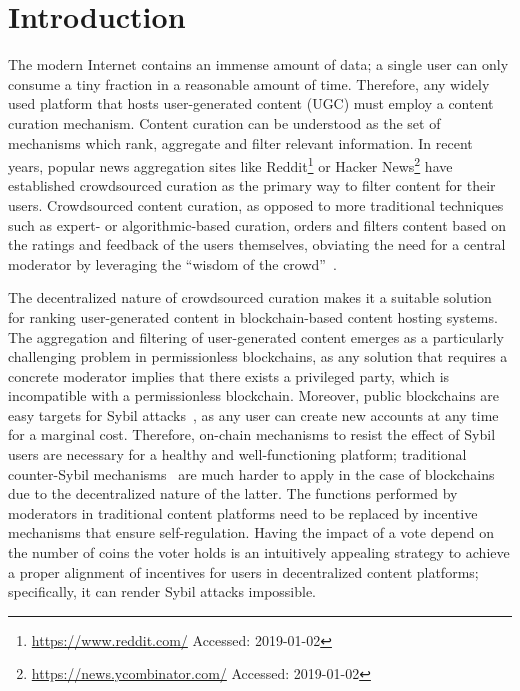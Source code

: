 \section{Introduction}
  The modern Internet contains an immense amount of data; a single user can only
  consume a tiny fraction in a reasonable amount of time. Therefore, any widely
  used platform that hosts user-generated content (UGC) must employ a content
  curation mechanism. Content curation can be understood as the set of
  mechanisms which rank, aggregate and filter relevant information. In recent
  years, popular news aggregation sites like
  Reddit\footnote{\url{https://www.reddit.com/} Accessed: 2019-01-02} or Hacker
  News\footnote{\url{https://news.ycombinator.com/} Accessed: 2019-01-02} have
  established crowdsourced curation as the primary way to filter content for
  their users. Crowdsourced content curation, as opposed to more traditional
  techniques such as expert- or algorithmic-based curation, orders and filters
  content based on the ratings and feedback of the users themselves, obviating
  the need for a central moderator by leveraging the ``wisdom of the
  crowd''~\cite{askalidis2013theoretical,zhu2010measurement}.

  The decentralized nature of crowdsourced curation makes it a suitable solution
  for ranking user-generated content in blockchain-based content hosting
  systems. The aggregation and filtering of user-generated content emerges as a
  particularly challenging problem in permissionless blockchains, as any
  solution that requires a concrete moderator implies that there exists a
  privileged party, which is incompatible with a permissionless blockchain.
  Moreover, public blockchains are easy targets for Sybil
  attacks~\cite{sybilattack}, as any user can create new accounts at any time
  for a marginal cost. Therefore, on-chain mechanisms to resist the effect of
  Sybil users are necessary for a healthy and well-functioning platform;
  traditional counter-Sybil mechanisms~\cite{levine2006survey} are much harder
  to apply in the case of blockchains due to the decentralized nature of the
  latter. The functions performed by moderators in traditional content platforms
  need to be replaced by incentive mechanisms that ensure self-regulation.
  Having the impact of a vote depend on the number of coins the voter holds is
  an intuitively appealing strategy to achieve a proper alignment of incentives
  for users in decentralized content platforms; specifically, it can render
  Sybil attacks impossible.

